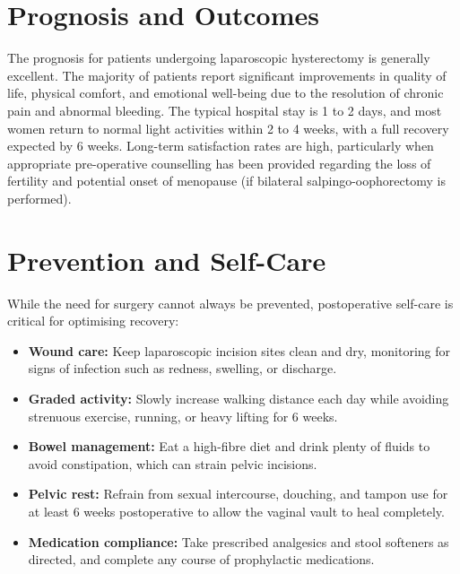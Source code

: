 \section*{Prognosis and Outcomes}
The prognosis for patients undergoing laparoscopic hysterectomy is generally excellent. The majority of patients report significant improvements in quality of life, physical comfort, and emotional well-being due to the resolution of chronic pain and abnormal bleeding. The typical hospital stay is 1 to 2 days, and most women return to normal light activities within 2 to 4 weeks, with a full recovery expected by 6 weeks. Long-term satisfaction rates are high, particularly when appropriate pre-operative counselling has been provided regarding the loss of fertility and potential onset of menopause (if bilateral salpingo-oophorectomy is performed).

\section*{Prevention and Self-Care}
While the need for surgery cannot always be prevented, postoperative self-care is critical for optimising recovery:
\begin{itemize}
    \item \textbf{Wound care:} Keep laparoscopic incision sites clean and dry, monitoring for signs of infection such as redness, swelling, or discharge.
    \item \textbf{Graded activity:} Slowly increase walking distance each day while avoiding strenuous exercise, running, or heavy lifting for 6 weeks.
    \item \textbf{Bowel management:} Eat a high-fibre diet and drink plenty of fluids to avoid constipation, which can strain pelvic incisions.
    \item \textbf{Pelvic rest:} Refrain from sexual intercourse, douching, and tampon use for at least 6 weeks postoperative to allow the vaginal vault to heal completely.
    \item \textbf{Medication compliance:} Take prescribed analgesics and stool softeners as directed, and complete any course of prophylactic medications.
\end{itemize}

